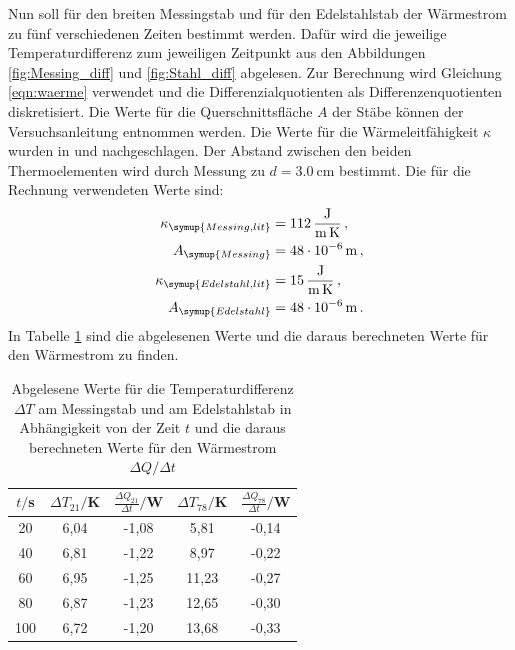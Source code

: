 Nun soll für den breiten Messingstab und für den Edelstahlstab der Wärmestrom
zu fünf verschiedenen Zeiten bestimmt werden. Dafür wird die jeweilige Temperaturdifferenz
zum jeweiligen Zeitpunkt aus den Abbildungen \ref{fig:Messing_diff} und
\ref{fig:Stahl_diff} abgelesen. Zur Berechnung wird Gleichung \eqref{eqn:waerme}
verwendet und die Differenzialquotienten als Differenzenquotienten diskretisiert.
Die Werte für die Querschnittsfläche $A$ der Stäbe können der Versuchsanleitung
\cite{Versuchsanleitung} entnommen werden. Die Werte für die Wärmeleitfähigkeit $\kappa$ wurden
in \cite{Wärmeleitfähigkeit1} und \cite{Wärmeleitfähigkeit3}
nachgeschlagen. Der Abstand zwischen den beiden Thermoelementen
wird durch Messung zu $d=\SI{3.0}{\centi\meter}$ bestimmt. Die für die Rechnung verwendeten Werte sind:
\begin{align}
  \kappa_{\symup{Messing,lit}} &= \SI{112}{\joule\per\meter\per\kelvin}\,, \nonumber\\
  A_{\symup{Messing}} &= \SI{48e-6}{\meter}\,, \nonumber\\
  \kappa_{\symup{Edelstahl,lit}} &= \SI{15}{\joule\per\meter\per\kelvin}\,, \nonumber\\
  A_{\symup{Edelstahl}} &= \SI{48e-6}{\meter}\,. \nonumber
\end{align}
In Tabelle \ref{tab:waermestrom} sind die abgelesenen Werte und die daraus berechneten Werte
für den Wärmestrom zu finden.

\begin{table}
  \centering
  \caption{Abgelesene Werte für die Temperaturdifferenz $\Delta T$ am Messingstab und am Edelstahlstab
  in Abhängigkeit von der Zeit $t$ und die daraus berechneten Werte für den Wärmestrom
  $\Delta Q/\Delta t$}
  \label{tab:waermestrom}
  \begin{tabular}{c c c c c}
    \toprule
    $t/$s & $\Delta T_{21}/$K & $\frac{\Delta Q_{21}}{\Delta t}/$W & $\Delta T_{78}/$K & $\frac{\Delta Q_{78}}{\Delta t}/$W \\
    \midrule
    20  & 6,04  & -1,08 & 5,81  & -0,14 \\
    40  & 6,81  & -1,22 & 8,97  & -0,22 \\
    60  & 6,95  & -1,25 & 11,23 & -0,27 \\
    80  & 6,87  & -1,23 & 12,65 & -0,30 \\
    100 & 6,72  & -1,20 & 13,68 & -0,33 \\
    \bottomrule
  \end{tabular}
\end{table}


